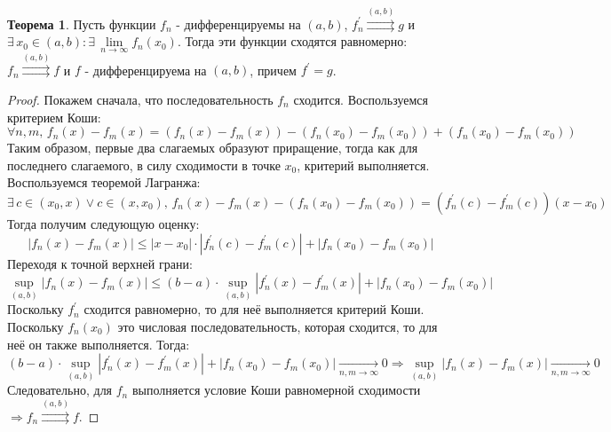 \documentclass[12pt]{article}
\theoremstyle{definition}
\newtheorem{theorem}{Теорема}
\newcommand{\uconv}[1]{\overset{#1}{\rightrightarrows}}
\begin{document}
\begin{theorem}
	Пусть функции $f_n$ - дифференцируемы на $(a,b)$, $f_n^\prime \uconv{(a,b)} g$ и $\exists \, x_0 \in (a,b) \colon \exists \, \lim\limits_{n \to \infty} f_n(x_0)$. Тогда  эти функции сходятся равномерно: $f_n \uconv{(a,b)} f$
	и $f$ - дифференцируема на $(a,b)$, причем $f^\prime = g$.
\end{theorem}
\begin{proof}
	Покажем сначала, что последовательность $f_n$ сходится. Воспользуемся критерием Коши:
	$$
		\forall n,m, \, f_n(x) - f_m(x) = (f_n(x) - f_m(x)) - (f_n(x_0) - f_m(x_0)) + (f_n(x_0) - f_m(x_0))
	$$
	Таким образом, первые два слагаемых образуют приращение, тогда как для последнего слагаемого, в силу сходимости в точке $x_0$, критерий выполняется. Воспользуемся теоремой Лагранжа:
	$$
		 \exists \, c \in (x_0, x) \vee c \in (x, x_0), \, f_n(x) - f_m(x) - (f_n(x_0) - f_m(x_0)) = \left(f_n^\prime(c) - f_m^\prime(c)\right)(x - x_0)
	$$
	Тогда получим следующую оценку:
	$$
		|f_n(x) - f_m(x)| \leq |x - x_0|{\cdot}|f_n^\prime(c) - f_m^\prime(c)| + |f_n(x_0) - f_m(x_0)| 
	$$
	Переходя к точной верхней грани:
	$$
		\sup\limits_{(a,b)}|f_n(x) - f_m(x)| \leq (b - a){\cdot}\sup\limits_{(a,b)}|f_n^\prime(x) - f_m^\prime(x)|+ |f_n(x_0) - f_m(x_0)| 
	$$
	Поскольку $f_n^\prime$ сходится равномерно, то для неё выполняется критерий Коши. Поскольку $f_n(x_0)$ это числовая последовательность, которая сходится, то для неё он также выполняется. Тогда:
	$$
		(b - a){\cdot}\sup\limits_{(a,b)}|f_n^\prime(x) - f_m^\prime(x)|+ |f_n(x_0) - f_m(x_0)|  \xrightarrow[n,m \to \infty]{} 0 \Rightarrow \sup\limits_{(a,b)}|f_n(x) - f_m(x)| \xrightarrow[n,m \to \infty]{}  0
	$$
	Следовательно, для $f_n$ выполняется условие Коши равномерной сходимости $\Rightarrow f_n \uconv{(a,b)} f$. 
	

\end{proof}
\end{document}
